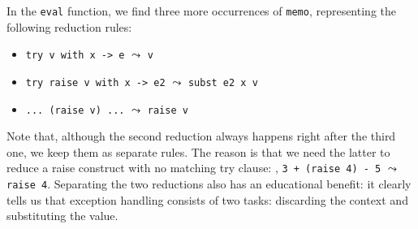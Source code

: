 In the \texttt{eval} function, we find three more occurrences of \texttt{memo}, representing the following reduction rules:

\begin{itemize}
  \item \texttt{try v with x -> e} $\leadsto$ \texttt{v}
  \item \texttt{try raise v with x -> e2} $\leadsto$ \texttt{subst e2 x v}
  \item \texttt{...\ (raise v) ...} $\leadsto$ \texttt{raise v}
\end{itemize}

\noindent Note that, although the second reduction always happens right after the third one, we keep them as separate rules.  The reason is that we need the latter to reduce a raise construct with no matching try clause: \eg, \texttt{3 + (raise 4) - 5} $\leadsto$ \texttt{raise 4}.  Separating the two reductions also has an educational benefit: it clearly tells us that exception handling consists of two tasks: discarding the context and substituting the value.



